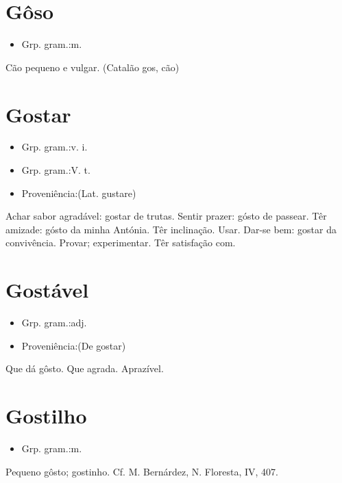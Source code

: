 \section{Gôso}
\begin{itemize}
\item {Grp. gram.:m.}
\end{itemize}
Cão pequeno e vulgar.
(Catalão \textunderscore gos\textunderscore , cão)
\section{Gostar}
\begin{itemize}
\item {Grp. gram.:v. i.}
\end{itemize}
\begin{itemize}
\item {Grp. gram.:V. t.}
\end{itemize}
\begin{itemize}
\item {Proveniência:(Lat. \textunderscore gustare\textunderscore )}
\end{itemize}
Achar sabor agradável: \textunderscore gostar de trutas\textunderscore .
Sentir prazer: \textunderscore gósto de passear\textunderscore .
Têr amizade: \textunderscore gósto da minha Antónia\textunderscore .
Têr inclinação.
Usar.
Dar-se bem: \textunderscore gostar da convivência\textunderscore .
Provar; experimentar.
Têr satisfação com.
\section{Gostável}
\begin{itemize}
\item {Grp. gram.:adj.}
\end{itemize}
\begin{itemize}
\item {Proveniência:(De \textunderscore gostar\textunderscore )}
\end{itemize}
Que dá gôsto.
Que agrada.
Aprazível.
\section{Gostilho}
\begin{itemize}
\item {Grp. gram.:m.}
\end{itemize}
Pequeno gôsto; gostinho. Cf. M. Bernárdez, \textunderscore N. Floresta\textunderscore , IV, 407.
